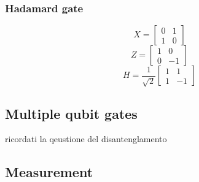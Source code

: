 \subsubsection{Hadamard gate}
\begin{equation}
    X = 
    \begin{bmatrix}
    0 & 1\\
    1 & 0
    \end{bmatrix}
\end{equation}
\begin{equation}
    Z = 
    \begin{bmatrix}
    1 & 0\\
    0 & -1
    \end{bmatrix}
\end{equation}
\begin{equation}
    H = \frac{1}{\sqrt{2}}
    \begin{bmatrix}
    1 & 1\\
    1 & -1
    \end{bmatrix}
\end{equation}
\subsection{Multiple qubit gates}
ricordati la qeustione del disantenglamento
\subsection{Measurement}\label{sec:measurement}